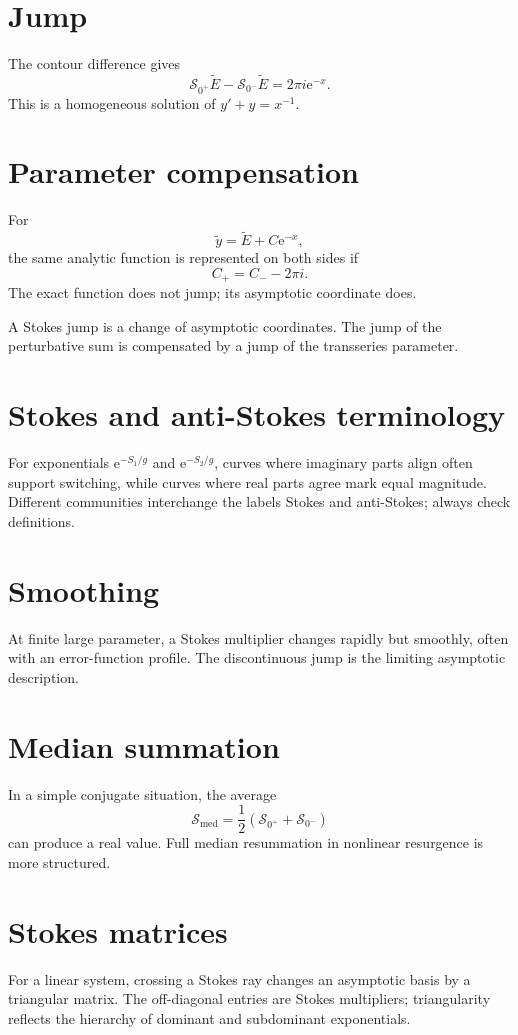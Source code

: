 \documentclass[11pt,oneside,openany]{book}
\newcommand{\e}{\mathrm{e}}
\theoremstyle{plain}
\theoremstyle{definition}
\theoremstyle{remark}
\begin{document}
\section{Jump}
The contour difference gives
\[
  \boxed{
  \mathcal S_{0^+}\widetilde E-
  \mathcal S_{0^-}\widetilde E
  =2\pi i\e^{-x}.}
\]
This is a homogeneous solution of $y'+y=x^{-1}$.

\section{Parameter compensation}
For
\[
  \widetilde y=\widetilde E+C\e^{-x},
\]
the same analytic function is represented on both sides if
\[
  C_+=C_--2\pi i.
\]
The exact function does not jump; its asymptotic coordinate does.

\begin{bigidea}
A Stokes jump is a change of asymptotic coordinates. The jump of the perturbative sum is compensated by a jump of the transseries parameter.
\end{bigidea}

\section{Stokes and anti-Stokes terminology}
For exponentials $\e^{-S_1/g}$ and $\e^{-S_2/g}$, curves where imaginary parts align often support switching, while curves where real parts agree mark equal magnitude. Different communities interchange the labels Stokes and anti-Stokes; always check definitions.

\section{Smoothing}
At finite large parameter, a Stokes multiplier changes rapidly but smoothly, often with an error-function profile. The discontinuous jump is the limiting asymptotic description.

\section{Median summation}
In a simple conjugate situation, the average
\[
  \mathcal S_{\mathrm{med}}
  =\frac12(\mathcal S_{0^+}+\mathcal S_{0^-})
\]
can produce a real value. Full median resummation in nonlinear resurgence is more structured.

\section{Stokes matrices}
For a linear system, crossing a Stokes ray changes an asymptotic basis by a triangular matrix. The off-diagonal entries are Stokes multipliers; triangularity reflects the hierarchy of dominant and subdominant exponentials.
\end{document}
